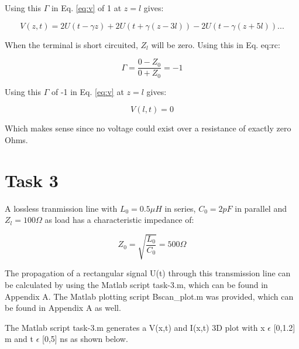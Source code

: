 \documentclass[final]{scrreprt} %
\begin{document}
Using this $\Gamma$ in Eq. \ref{eq:v} of 1 at $z = l$ gives:

\begin{equation}
	V(z,t) = 2U(t - \gamma z) + 2U(t + \gamma(z - 3l)) - 2U(t - \gamma(z + 5l)) ...
\label{eq:v}
\end{equation}

When the terminal is short circuited, $Z_l$ will be zero. Using this in Eq. {eq:rc}:

\begin{equation}
	\Gamma = \frac{0 - Z_0}{0 + Z_0} = -1
\end{equation}

Using this $\Gamma$ of -1 in Eq. \ref{eq:v} at $z = l$ gives:

\begin{equation}
	V(l,t) = 0
\end{equation}

Which makes sense since no voltage could exist over a resistance of exactly zero Ohms.

\section{Task 3}
A lossless tranmission line with $L_0 = 0.5 \mu H$ in series, $C_0 = 2 pF$ in parallel and $Z_l = 100 \Omega$ as load has a characteristic impedance of:

\begin{equation}
	Z_0 = \sqrt{\frac{L_0}{C_0}} = 500 \Omega
\end{equation}

The propagation of a rectangular signal U(t) through this transmission line can be calculated by using the Matlab script task-3.m, which can be found in Appendix A. The Matlab plotting script Bscan\_plot.m was provided, which can be found in Appendix A as well.

The Matlab script task-3.m generates a V(x,t) and I(x,t) 3D plot with x $\epsilon$ [0,1.2] m and t $\epsilon$ [0,5] ns as shown below.

\iffalse
\begin{figure}[H]
	\centering
	\setlength\figureheight{0.8\linewidth}
    	\setlength\figurewidth{0.8\linewidth}
	
	\label{fig:wheel-torque-labcar}
	\caption{Voltage on the transmission channel with rectangular pulse.}
\end{figure}

\begin{figure}[H]
	\centering
	\setlength\figureheight{0.8\linewidth}
    	\setlength\figurewidth{0.8\linewidth}
	
	\label{fig:wheel-torque-labcar}
	\caption{Current through the transmission channel with rectangular pulse.}
\end{figure}
\fi
\end{document}
